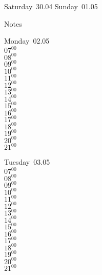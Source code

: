 \documentclass[11pt,a4paper]{book}\usepackage[]{graphicx}\usepackage[]{color}
\begin{document}
\begin{weekendbox}
  Saturday~30.04
  \tcblower
  Sunday~01.05
\end{weekendbox} %
\begin{notebox}
  Notes
\end{notebox}
\clearpage
\begin{headerbox}
\end{headerbox}
\begin{weekdaybox}
  Monday~02.05\\
  { 
  \vfill
  $07^{00}$\\
$08^{00}$\\
$09^{00}$\\
$10^{00}$\\
$11^{00}$\\
$12^{00}$\\
$13^{00}$\\
$14^{00}$\\
$15^{00}$\\
$16^{00}$\\
$17^{00}$\\
$18^{00}$\\
$19^{00}$\\
$20^{00}$\\
$21^{00}$\\
  }
\end{weekdaybox}
\begin{weekdaybox}
  Tuesday~03.05\\
  { 
  \vfill
  $07^{00}$\\
$08^{00}$\\
$09^{00}$\\
$10^{00}$\\
$11^{00}$\\
$12^{00}$\\
$13^{00}$\\
$14^{00}$\\
$15^{00}$\\
$16^{00}$\\
$17^{00}$\\
$18^{00}$\\
$19^{00}$\\
$20^{00}$\\
$21^{00}$\\
  }
\end{weekdaybox}
\end{document}
